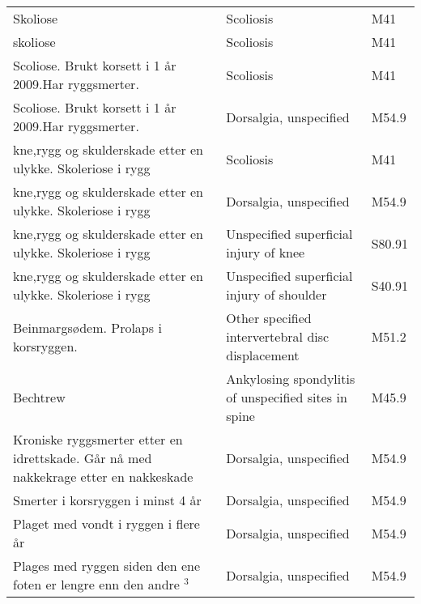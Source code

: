 \begin{table}[H]
{\begin{tabular}{|lll|}
		\hline
		
        \rowcolor[HTML]{88CC88}        
		\multicolumn{3}{|l|}{Spine and back}   \\
		\hline   		

		Skoliose                                                                             & Scoliosis                                            & M41 \\
		skoliose                                                                             & Scoliosis                                            & M41 \\
		Scoliose. Brukt korsett i 1 år 2009.Har ryggsmerter.                                 & Scoliosis                                            & M41 \\
		Scoliose. Brukt korsett i 1 år 2009.Har ryggsmerter.                                 & Dorsalgia, unspecified                               & M54.9 \\		
		kne,rygg og skulderskade etter en ulykke.  Skoleriose i rygg                         & Scoliosis                                            & M41 \\		
		kne,rygg og skulderskade etter en ulykke.  Skoleriose i rygg                         & Dorsalgia, unspecified                               & M54.9 \\							
		kne,rygg og skulderskade etter en ulykke.  Skoleriose i rygg                         & Unspecified superficial injury of knee               & S80.91 \\				
		kne,rygg og skulderskade etter en ulykke.  Skoleriose i rygg                         & Unspecified superficial injury of shoulder           & S40.91 \\			
		Beinmargsødem. Prolaps i korsryggen.                                                 & Other specified intervertebral disc displacement     & M51.2 \\
		Bechtrew                                                                             & Ankylosing spondylitis of unspecified sites in spine & M45.9 \\
		Kroniske ryggsmerter etter en idrettskade. Går nå med nakkekrage etter en nakkeskade & Dorsalgia, unspecified                               & M54.9 \\	
		Smerter i korsryggen i minst 4 år                                                    & Dorsalgia, unspecified                               & M54.9 \\
		Plaget med vondt i ryggen i flere år                                                 & Dorsalgia, unspecified                               & M54.9 \\
		Plages med ryggen siden den ene foten er lengre enn den andre $^3$                    & Dorsalgia, unspecified                               & M54.9 \\


\end{tabular}}
\end{table}
